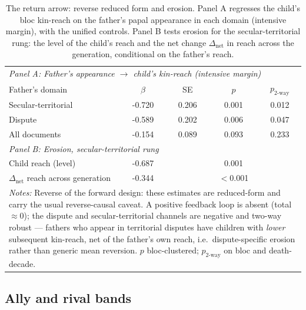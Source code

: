 \documentclass[12pt]{article}
\theoremstyle{definition}
\theoremstyle{remark}
\begin{document}
\begin{table}[t]
\centering
\caption{The return arrow: reverse reduced form and erosion. Panel A regresses the child's bloc kin-reach on the father's papal appearance in each domain (intensive margin), with the unified controls. Panel B tests erosion for the secular-territorial rung: the level of the child's reach and the net change $\Delta_{\text{net}}$ in reach across the generation, conditional on the father's reach.}
\label{tab:app_reverse}
\begin{tabular}{lcccc}
\toprule
\multicolumn{5}{l}{\textit{Panel A: Father's appearance $\rightarrow$ child's kin-reach (intensive margin)}} \\
\addlinespace
Father's domain & $\beta$ & SE & $p$ & $p_{\text{2-way}}$ \\
\midrule
Secular-territorial & -0.720 & 0.206 & 0.001 & 0.012 \\
Dispute & -0.589 & 0.202 & 0.006 & 0.047 \\
All documents & -0.154 & 0.089 & 0.093 & 0.233 \\
\midrule
\multicolumn{5}{l}{\textit{Panel B: Erosion, secular-territorial rung}} \\
\addlinespace
Child reach (level) & -0.687 & & 0.001 & \\
$\Delta_{\text{net}}$ reach across generation & -0.344 & & $<$0.001 & \\
\midrule
\multicolumn{5}{p{0.85\textwidth}}{\footnotesize \textit{Notes:} Reverse of the forward design: these estimates are reduced-form and carry the usual reverse-causal caveat. A positive feedback loop is absent (total $\approx 0$); the dispute and secular-territorial channels are negative and two-way robust --- fathers who appear in territorial disputes have children with \emph{lower} subsequent kin-reach, net of the father's own reach, i.e.\ dispute-specific erosion rather than generic mean reversion. $p$ bloc-clustered; $p_{\text{2-way}}$ on bloc and death-decade.} \\
\bottomrule
\end{tabular}
\end{table}



\subsection{Ally and rival bands}
\label{app:bands}
\end{document}
